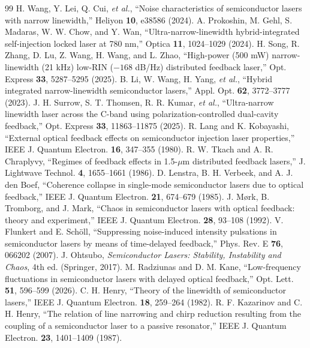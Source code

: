 \documentclass{optica-article}
\begin{document}
\begin{thebibliography}{99}
 H. Wang, Y. Lei, Q. Cui, \emph{et al.}, ``Noise characteristics of semiconductor lasers with narrow linewidth,'' Heliyon \textbf{10}, e38586 (2024).
 A. Prokoshin, M. Gehl, S. Madaras, W. W. Chow, and Y. Wan, ``Ultra-narrow-linewidth hybrid-integrated self-injection locked laser at 780 nm,'' Optica \textbf{11}, 1024--1029 (2024).
 H. Song, R. Zhang, D. Lu, Z. Wang, H. Wang, and L. Zhao, ``High-power (500 mW) narrow-linewidth (21 kHz) low-RIN ($-168$ dB/Hz) distributed feedback laser,'' Opt. Express \textbf{33}, 5287--5295 (2025).
 B. Li, W. Wang, H. Yang, \emph{et al.}, ``Hybrid integrated narrow-linewidth semiconductor lasers,'' Appl. Opt. \textbf{62}, 3772--3777 (2023).
 J. H. Surrow, S. T. Thomsen, R. R. Kumar, \emph{et al.}, ``Ultra-narrow linewidth laser across the C-band using polarization-controlled dual-cavity feedback,'' Opt. Express \textbf{33}, 11863--11875 (2025).
 R. Lang and K. Kobayashi, ``External optical feedback effects on semiconductor injection laser properties,'' IEEE J. Quantum Electron. \textbf{16}, 347--355 (1980).
 R. W. Tkach and A. R. Chraplyvy, ``Regimes of feedback effects in 1.5-$\mu$m distributed feedback lasers,'' J. Lightwave Technol. \textbf{4}, 1655--1661 (1986).
 D. Lenstra, B. H. Verbeek, and A. J. den Boef, ``Coherence collapse in single-mode semiconductor lasers due to optical feedback,'' IEEE J. Quantum Electron. \textbf{21}, 674--679 (1985).
 J. M\o rk, B. Tromborg, and J. Mark, ``Chaos in semiconductor lasers with optical feedback: theory and experiment,'' IEEE J. Quantum Electron. \textbf{28}, 93--108 (1992).
 V. Flunkert and E. Sch\"oll, ``Suppressing noise-induced intensity pulsations in semiconductor lasers by means of time-delayed feedback,'' Phys. Rev. E \textbf{76}, 066202 (2007).
 J. Ohtsubo, \textit{Semiconductor Lasers: Stability, Instability and Chaos}, 4th ed. (Springer, 2017).
 M. Radziunas and D. M. Kane, ``Low-frequency fluctuations in semiconductor lasers with delayed optical feedback,'' Opt. Lett. \textbf{51}, 596--599 (2026).
 C. H. Henry, ``Theory of the linewidth of semiconductor lasers,'' IEEE J. Quantum Electron. \textbf{18}, 259--264 (1982).
 R. F. Kazarinov and C. H. Henry, ``The relation of line narrowing and chirp reduction resulting from the coupling of a semiconductor laser to a passive resonator,'' IEEE J. Quantum Electron. \textbf{23}, 1401--1409 (1987).

\end{thebibliography}
\end{document}

